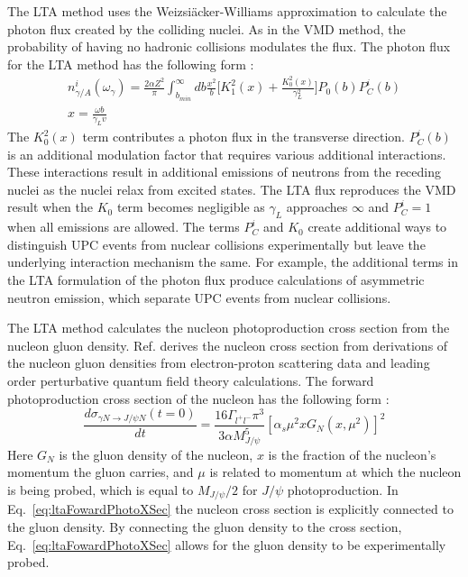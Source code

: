     The LTA method uses the Weizsi\"{a}cker-Williams approximation to calculate 
      the photon flux created by the colliding nuclei. 
    As in the VMD method, the probability of having no hadronic collisions 
      modulates the flux.
    The photon flux for the LTA method has the following form \cite{lta2011.09}:
    \begin{eqnarray} \label{eq:ltaPhotonFlux}
      n_{\gamma/A}^{i}(\omega_{\gamma})=\frac{2\alpha Z^{2}}{\pi}\int_{b_{min}}^{\infty}
        db\frac{x^{2}}{b}\Big[K_{1}^{2}(x)+\frac{K_{0}^{2}(x)}{\gamma_{L}^{2}}\Big]
        P_{0}(b)P_{C}^{i}(b) \\
      x=\frac{\omega b}{\gamma_{L} v} \nonumber 
    \end{eqnarray}
    The $K_{0}^{2}(x)$ term contributes a photon flux in the 
      transverse direction.
    $P_{C}^{i}(b)$ is an additional modulation factor that requires various 
      additional interactions. 
    These interactions result in additional emissions of neutrons from the 
      receding nuclei as the nuclei relax from excited states. 
    The LTA flux reproduces the VMD result when the $K_{0}$ term becomes 
      negligible as $\gamma_{L}$ approaches $\infty$ and $P_{C}^{i}=1$ when all
      emissions are allowed.
    The terms $P_{C}^{i}$ and $K_{0}$ create additional ways to distinguish UPC
      events from nuclear collisions experimentally but leave the underlying 
      interaction mechanism the same. 
    For example, the additional terms in the LTA formulation of the photon flux
      produce calculations of asymmetric neutron emission, which separate UPC 
      events from nuclear collisions.  

    The LTA method calculates the nucleon photoproduction cross section 
      from the nucleon gluon density. 
    Ref. \cite{lta2011.09} derives the nucleon cross section from derivations
     of the nucleon gluon densities from electron-proton scattering data and
     leading order perturbative quantum field theory calculations.
    The forward photoproduction cross section of the nucleon has the following
     form \cite{lta2011.09}:
   \begin{equation} \label{eq:ltaFowardPhotoXSec}
     \frac{d\sigma_{\gamma N\rightarrow J/\psi N}(t=0)}{dt}=\frac{16\Gamma_{l^{+}l^{-}}\pi^{3}}
     {3\alpha M_{J/\psi}^{5}}[\alpha_{s}\mu^{2}xG_{N}(x,\mu^{2})]^{2}
   \end{equation}
   Here $G_{N}$ is the gluon density of the nucleon, $x$ is the fraction of
     the nucleon's momentum the gluon carries, and $\mu$ is related
     to momentum at which the nucleon is being probed, which is equal to 
     $M_{J/\psi}/2$ for $J/\psi$ photoproduction.
   In Eq.~\ref{eq:ltaFowardPhotoXSec} the nucleon cross section is explicitly 
     connected to the gluon density.
   By connecting the gluon density to the cross section, Eq.~\ref{eq:ltaFowardPhotoXSec}
     allows for the gluon density to be experimentally probed. 

